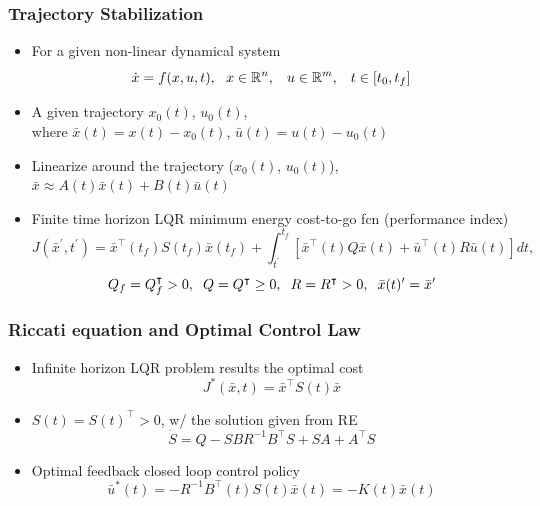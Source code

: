\documentclass{beamer}
\begin{document}
\begin{frame}
\frametitle{Trajectory Stabilization}
\begin{itemize}
\item For a given non-linear dynamical system
\begin{equation*}
\dot{x} = f(x,u,t), \hspace{.23cm} x\in \mathbb{R}^n, \hspace{.3cm} u\in \mathbb{R}^m, \hspace{.3cm} t \in [t_0, t_f]
\end{equation*} 
\item A given trajectory $x_0(t)$, $u_0(t)$,\\ where $\bar{x}(t)=x(t)-x_0(t)$, $\bar{u}(t)=u(t)-u_0(t)$
\item Linearize around the trajectory ($x_0(t)$, $u_0(t)$), $\bar{x}\approx A(t)\bar{x}(t)+B(t)\bar{u}(t)$ 
\item Finite time horizon LQR minimum energy cost-to-go fcn (performance index)
\begin{equation*}
J({\bar{x}^{\prime}, t^{\prime}})= \bar{x}^{\intercal}(t_f)S(t_f)\bar{x}(t_f)+  \int_{t^{\prime}}^{t_f} [ \bar{x}^{\intercal}(t)Q\bar{x}(t)+\bar{u}^{\intercal}(t)R\bar{u}(t)]dt,
\end{equation*}
\begin{equation*}
Q_f=Q_f^{\intercal}> 0, \hspace{.2cm} Q=Q^{\intercal}\geq 0, \hspace{.2cm} R=R^{\intercal}> 0, \hspace{.2cm} \bar{x}(t)^{\prime}=\bar{x}^{\prime}
\end{equation*}
\end{itemize}
\end{frame}


\begin{frame}
\frametitle{Riccati equation and Optimal Control Law}
\begin{itemize}
\item Infinite horizon LQR problem results the optimal cost
\begin{equation*}
J^{\ast}(\bar{x},t)=\bar{x}^{\intercal}S(t)\bar{x}
\end{equation*} 
\item $S(t)=S(t)^{\intercal} > 0$, w/ the solution given from RE
\begin{equation*}
\dot{S}=Q-SBR^{-1}B^{\intercal}S+SA+A^{\intercal}S
\end{equation*}
\item Optimal feedback closed loop control policy 
\begin{equation*}
\bar{u}^{\ast}(t)=-R^{-1}B^{\intercal}(t)S(t)\bar{x}(t)=-K(t)\bar{x}(t)
\end{equation*}
\end{itemize}
\end{frame}
\end{document}
